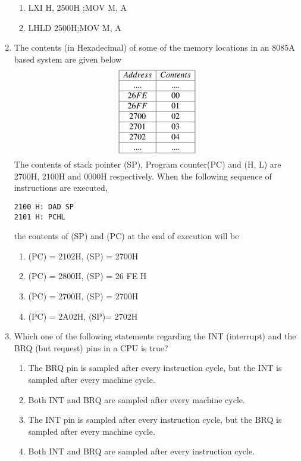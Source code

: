 \documentclass[journal,12pt,twocolumn]{IEEEtran}
\begin{document}
\begin{enumerate}
\begin{enumerate}
      \item LXI H, 2500H ;MOV M, A
      \item LHLD 2500H;MOV M, A
    \end{enumerate}
    \item The contents (in Hexadecimal) of some of the memory locations in an 8085A based system are
given below\\
\begin{displaymath}
\begin{array}{|c|c|} \hline
Address & Contents  \\\hline
....  & ....      \\\hline
26FE  &  00       \\\hline
26FF & 01         \\\hline
2700 & 02         \\\hline
2701 & 03         \\\hline
2702 & 04         \\\hline
....  & ....      \\\hline
\end{array}
\end{displaymath}
The contents of stack pointer (SP), Program counter(PC) and (H, L) are 2700H, 2100H and
0000H respectively. When the following sequence of instructions are executed,\\
\begin{verbatim}
2100 H: DAD SP
2101 H: PCHL
\end{verbatim}
the contents of (SP) and (PC) at the end of execution will be\\
     \begin{enumerate}
      \item (PC) = 2102H, (SP) = 2700H 
      \item (PC) = 2800H, (SP) = 26 FE H 
      \item (PC) = 2700H, (SP) = 2700H 
      \item (PC) = 2A02H, (SP)= 2702H
    \end{enumerate}
    \item Which one of the following statements regarding the INT (interrupt) and the BRQ (but request)
pins in a CPU is true?\\


%
                 
         \begin{enumerate}
         \item The BRQ pin is sampled after every instruction cycle, but the INT is sampled after every
machine cycle.
         \item Both INT and BRQ are sampled after every machine cycle.
         \item The INT pin is sampled after every instruction cycle, but the BRQ is sampled after every
machine cycle.
         \item Both INT and BRQ are sampled after every instruction cycle.
         \end{enumerate}
              

\end{enumerate}
\end{document}
